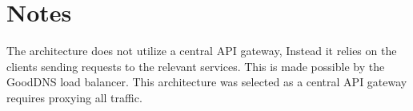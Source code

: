 \documentclass[12pt]{article}
\begin{document}
\clearpage

\section{Notes}
The architecture does not utilize a central API gateway, Instead it relies on the clients sending requests to the relevant services.
This is made possible by the GoodDNS \cite{heimonenSlenderman00GoodDns2023} load balancer. This architecture was selected as a central
API gateway requires proxying all traffic.


\pagebreak
\printbibliography
\end{document}
